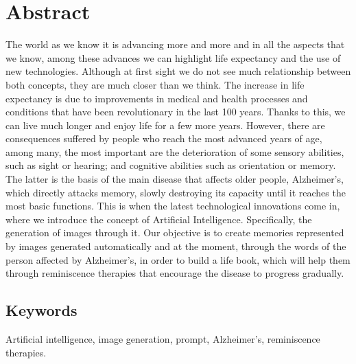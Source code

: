 \chapter*{Abstract}
\renewcommand{\baselinestretch}{1.5}
The world as we know it is advancing more and more and in all the aspects that we know, among these advances we can highlight life expectancy and the use of new technologies. Although at first sight we do not see much relationship between both concepts, they are much closer than we think. The increase in life expectancy is due to improvements in medical and health processes and conditions that have been revolutionary in the last 100 years. Thanks to this, we can live much longer and enjoy life for a few more years. However, there are consequences suffered by people who reach the most advanced years of age, among many, the most important are the deterioration of some sensory abilities, such as sight or hearing; and cognitive abilities such as orientation or memory. The latter is the basis of the main disease that affects older people, Alzheimer's, which directly attacks memory, slowly destroying its capacity until it reaches the most basic functions. This is when the latest technological innovations come in, where we introduce the concept of Artificial Intelligence. Specifically, the generation of images through it. Our objective is to create memories represented by images generated automatically and at the moment, through the words of the person affected by Alzheimer's, in order to build a life book, which will help them through reminiscence therapies that encourage the disease to progress gradually.


\section*{Keywords}

\noindent Artificial intelligence, image generation, prompt, Alzheimer's, reminiscence therapies.



